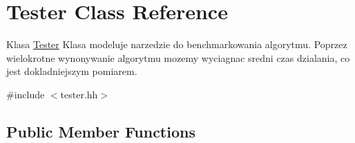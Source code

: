 \hypertarget{class_tester}{\section{Tester Class Reference}
\label{class_tester}
}


Klasa \hyperlink{class_tester}{Tester} Klasa modeluje narzedzie do benchmarkowania algorytmu. Poprzez wielokrotne wynonywanie algorytmu mozemy wyciagnac sredni czas dzialania, co jest dokladniejszym pomiarem.  




{\ttfamily \#include $<$tester.\-hh$>$}

\subsection*{Public Member Functions}
